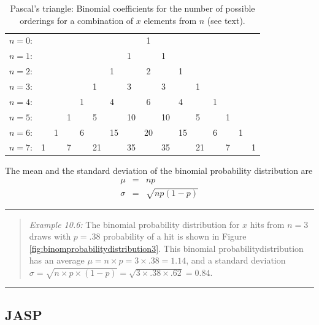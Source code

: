 \documentclass[
]{book}
\begin{document}
\begin{longtable}[]{@{}llllllllclllllll@{}}
\caption{\label{tab:pascaltriangle} Pascal's triangle: Binomial coefficients for the
number of possible orderings for a combination of \(x\) elements from \(n\) (see text).}\tabularnewline
\toprule
\endhead
\(n= 0\): & & & & & & & & 1 & & & & & & & \\
\(n= 1\): & & & & & & & 1 & & 1 & & & & & & \\
\(n= 2\): & & & & & & 1 & & 2 & & 1 & & & & & \\
\(n= 3\): & & & & & 1 & & 3 & & 3 & & 1 & & & & \\
\(n= 4\): & & & & 1 & & 4 & & 6 & & 4 & & 1 & & & \\
\(n= 5\): & & & 1 & & 5 & & 10 & & 10 & & 5 & & 1 & & \\
\(n= 6\): & & 1 & & 6 & & 15 & & 20 & & 15 & & 6 & & 1 & \\
\(n= 7\): & 1 & & 7 & & 21 & & 35 & & 35 & & 21 & & 7 & & 1 \\
\bottomrule
\end{longtable}

The mean and the standard deviation of the binomial probability distribution
are \[\begin{aligned}
    \mu & = & np \\
    \sigma & = & \sqrt{ np(1-p) }\end{aligned}\]

\begin{center}\rule{0.5\linewidth}{0.5pt}\end{center}

\begin{quote}
\emph{Example 10.6:}
The binomial probability distribution for \(x\) hits from \(n=3\) draws with
\(p=.38\) probability of a hit is shown in
Figure \ref{fig:binomprobabilitydistribution3}. This binomial probabilitydistribution has an average \(\mu=n \times p = 3 \times .38 = 1.14\), and a standard deviation
\(\sigma = \sqrt{n \times p \times (1-p)} = \sqrt{ 3 \times .38 \times .62} = 0.84\).
\end{quote}

\begin{center}\rule{0.5\linewidth}{0.5pt}\end{center}

\hypertarget{jasp-4}{%
\subsection{JASP}\label{jasp-4}}
\end{document}
